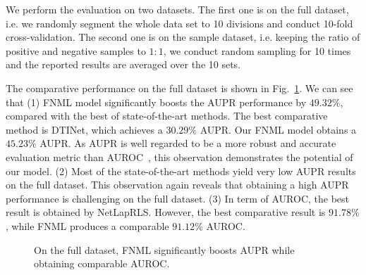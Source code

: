 \documentclass[journal]{IEEEtran}
\begin{document}
We perform the evaluation on two datasets. The first one is on the full dataset, i.e. we randomly segment the whole data set to 10 divisions and conduct 10-fold cross-validation. The second one is on the sample dataset, i.e. keeping the ratio of positive and negative samples to $1:1$, we conduct random sampling for 10 times and the reported results are averaged over the 10 sets. 

The comparative performance on the full dataset is shown in Fig.~\ref{fig:full}. We can see that (1) FNML model significantly boosts the AUPR performance by $49.32\%$, compared with the best of state-of-the-art methods. The best comparative method is DTINet, which achieves a $30.29\%$ AUPR. Our FNML model obtains a $45.23\%$ AUPR. As AUPR is well regarded to be a more robust and accurate evaluation metric than AUROC~\cite{Luo2017Network}, this observation demonstrates the potential of our model. (2) Most of the state-of-the-art methods yield very low AUPR results on the full dataset. This observation again reveals that obtaining a high AUPR performance is challenging on the full dataset. (3) In term of AUROC, the best result is obtained by NetLapRLS. However, the best comparative result is $91.78\%$, while FNML produces a comparable $91.12\%$ AUROC. 

\begin{figure}[t]
\centering
{}
\caption{On the full dataset, FNML significantly boosts AUPR while obtaining comparable AUROC.}\label{fig:full}
\end{figure}
\end{document}

